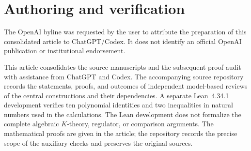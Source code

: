 \documentclass[11pt,a4paper]{amsart}
\numberwithin{equation}{section}
\theoremstyle{definition}
\theoremstyle{remark}
\begin{document}


\section*{Authoring and verification}
The OpenAI byline was requested by the user to attribute the preparation
of this consolidated article to ChatGPT/Codex. It does not identify an
official OpenAI publication or institutional endorsement.

This article consolidates the source manuscripts and the subsequent proof
audit with assistance from ChatGPT and Codex. The accompanying source
repository records the statements, proofs, and outcomes of independent
model-based reviews of the central constructions and their dependencies.
A separate Lean~4.34.1 development verifies ten polynomial identities
and two inequalities in natural numbers used in the calculations.
The Lean development does not formalize the complete algebraic
$K$-theory, regulator, or comparison arguments. The mathematical proofs
are given in the article; the repository records the precise scope of
the auxiliary checks and preserves the original sources.

\end{document}
